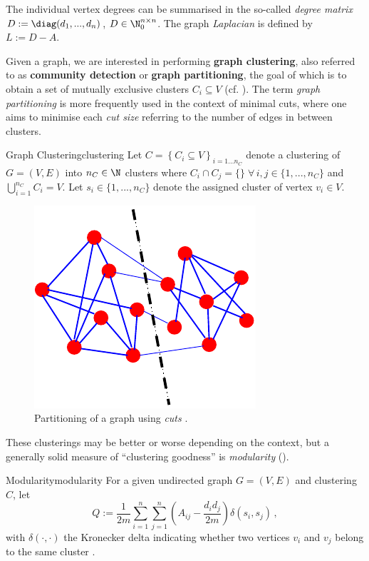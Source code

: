 \documentclass[12pt, a4paper]{article}
\begin{document}
  The individual vertex degrees can be summarised in the so-called \textit{degree matrix} $D := \diag(d_1, ..., d_n)$, $D \in \N_0^{n \times n}$. The graph \textit{Laplacian} is defined by $L := D - A$.

  Given a graph, we are interested in performing \textbf{graph clustering}, also referred to as \textbf{community detection} or \textbf{graph partitioning}, the goal of which is to obtain a set of mutually exclusive clusters $C_i \subseteq V$ (cf. ).
  The term \textit{graph partitioning} is more frequently used in the context of minimal cuts, where one aims to minimise each \textit{cut size} referring to the number of edges in between clusters.

  \begin{definition}{Graph Clustering}{clustering}
    Let $C = \left\{C_i \subseteq V \right\}_{i=1 ... n_C}$ denote a clustering of $G = (V, E)$ into $n_C \in \N$ clusters where $C_i \cap C_j = \{\} \; \forall\,i, j \in \{1, ..., n_C\}$ and $\bigcup_{i=1}^{n_C} C_i = V$. Let $s_i \in \{1, ..., n_C\}$ denote the assigned cluster of vertex $v_i \in V$.
  \end{definition}

  \begin{figure}[h]
    \centering
    \includegraphics[width=0.3\linewidth]{figures/graphpartitioning.pdf}
    \caption{Partitioning of a graph using \textit{cuts} \parencite{fortunato-2009}.}
  \end{figure}

  These clusterings may be better or worse depending on the context, but a generally solid measure of ``clustering goodness'' is \textit{modularity} ().

  \begin{definition}{Modularity}{modularity}
    For a given undirected graph $G = (V, E)$ and clustering $C$, let $$Q := \frac{1}{2m} \sum_{i=1}^{n} \sum_{j=1}^{n} \left(A_{ij} - \frac{d_i d_j}{2m}\right) \delta(s_i, s_j)\,,$$ with $\delta(\cdot, \cdot)$ the Kronecker delta indicating whether two vertices $v_i$ and $v_j$ belong to the same cluster \parencite{lambiotte-louvain-clustering}.
  \end{definition}
\end{document}
